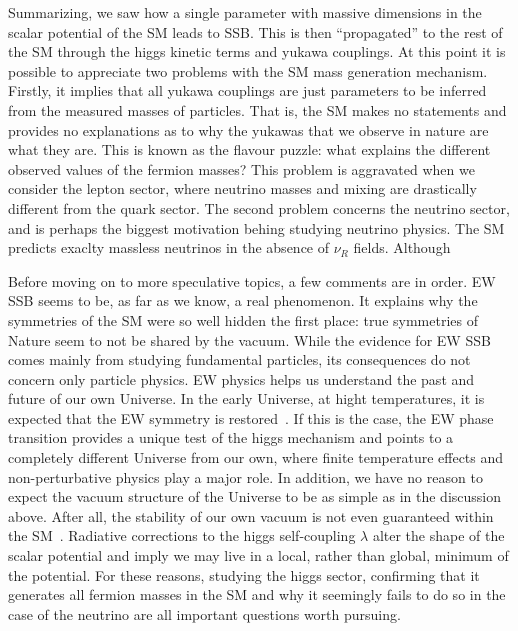 Summarizing, we saw how a single parameter with massive dimensions in the scalar potential of the SM leads to SSB. This is then ``propagated'' to the rest of the SM through the higgs kinetic terms and yukawa couplings. At this point it is possible to appreciate two problems with the SM mass generation mechanism. Firstly, it implies that all yukawa couplings are just parameters to be inferred from the measured masses of particles. That is, the SM makes no statements and provides no explanations as to why the yukawas that we observe in nature are what they are. This is known as the flavour puzzle: what explains the different observed values of the fermion masses? This problem is aggravated when we consider the lepton sector, where neutrino masses and mixing are drastically different from the quark sector. The second problem concerns the neutrino sector, and is perhaps the biggest motivation behing studying neutrino physics. The SM predicts exaclty massless neutrinos in the absence of $\nu_R$ fields. Although  

Before moving on to more speculative topics, a few comments are in order. EW SSB seems to be, as far as we know, a real phenomenon. It explains why the symmetries of the SM were so well hidden the first place: true symmetries of Nature seem to not be shared by the vacuum. While the evidence for EW SSB comes mainly from studying fundamental particles, its consequences do not concern only particle physics. EW physics helps us understand the past and future of our own Universe. In the early Universe, at hight temperatures, it is expected that the EW symmetry is restored~\cite{Kirzhnits:1972ut,Dolan:1973qd,Weinberg:1974hy}. If this is the case, the EW phase transition provides a unique test of the higgs mechanism and points to a completely different Universe from our own, where finite temperature effects and non-perturbative physics play a major role. In addition, we have no reason to expect the vacuum structure of the Universe to be as simple as in the discussion above. After all, the stability of our own vacuum is not even guaranteed within the SM~\cite{Cabibbo:1979ay,Degrassi:2012ry}. Radiative corrections to the higgs self-coupling $\lambda$ alter the shape of the scalar potential and imply we may live in a local, rather than global, minimum of the potential. For these reasons, studying the higgs sector, confirming that it generates all fermion masses in the SM and why it seemingly fails to do so in the case of the neutrino are all important questions worth pursuing.





